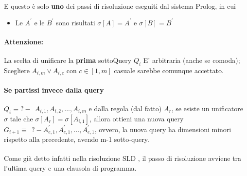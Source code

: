 \documentclass[12pt, a4paper, openany, oneside]{book}
\begin{document}
{E questo è solo \textbf{uno} dei passi di risoluzione eseguiti dal sistema Prolog,
in cui \begin{itemize}
\item Le $A^{'}$ e le $B^{'}$ sono risultati $\sigma[A] = A^{'}$ e 
$\sigma[B] = B^{'}$
\end{itemize}
\paragraph{Attenzione: } La scelta di unificare la \textbf{prima} sottoQuery 
$Q_{i}$ E' arbitraria (anche se comoda); Scegliere $A_{i,m} \vee A_{i,c}$ con 
$c \in [1,m]$ casuale sarebbe comunque accettato.
\paragraph{Se partissi invece dalla query} 
$Q_{i} \equiv ?- ~~ A_{i,1}, A_{i,2}, ..., A_{i,m}$ e dalla regola (dal fatto) 
$A_{r}$, se esiste un unificatore $\sigma$ tale che $\sigma [A_{r}] = \sigma [A_{i,1}]$,
allora ottieni una nuova query $G_{i+1} \equiv ~~ ?- A_{e,1}^{'}, A_{e,1}^{'}, 
..., A_{e,1}^{'} $, ovvero, la nuova query ha dimensioni minori rispetto alla 
precedente, avendo m-1 sotto-query.
\\ \\
Come già detto infatti nella risoluzione SLD , il passo di risoluzione avviene 
tra l'ultima query e una clausola di programma. 
}
\end{document}
